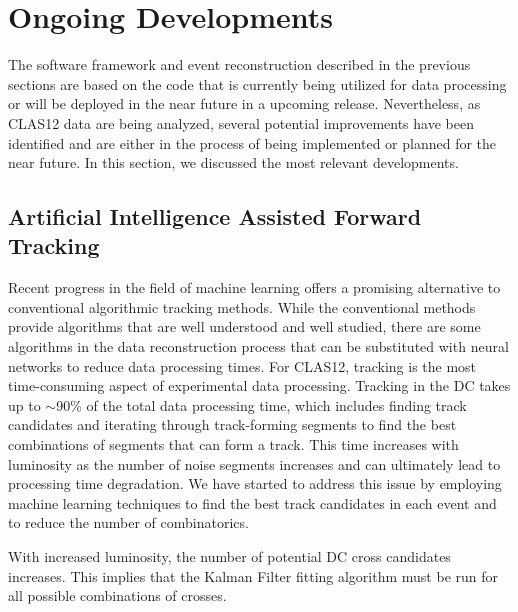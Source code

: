 \section{Ongoing Developments}

The software framework and event reconstruction described in the previous sections are based on the code that
is currently being utilized for data processing or will be deployed in the near future in a upcoming release.
Nevertheless, as CLAS12 data are being analyzed, several potential improvements have been identified and are
either in the process of being implemented or planned for the near future. In this section, we discussed the most
relevant developments.

\subsection{Artificial Intelligence Assisted Forward Tracking}

Recent progress in the field of machine learning offers a promising alternative to conventional algorithmic tracking
methods. While the conventional methods provide algorithms that are well understood and well studied, there are
some algorithms in the data reconstruction process that can be substituted with neural networks to reduce data
processing times. For CLAS12, tracking is the most time-consuming aspect of experimental data processing.
Tracking in the DC takes up to $\sim$90\% of the total data processing time, which includes finding track
candidates and iterating through track-forming segments to find the best combinations of segments that can form
a track. This time increases with luminosity as the number of noise segments increases and can ultimately lead to
processing time degradation. We have started to address this issue by employing machine learning techniques
to find the best track candidates in each event and to reduce the number of combinatorics.

With increased luminosity, the number of potential DC cross candidates increases. This implies that the Kalman
Filter fitting algorithm must be run for all possible combinations of crosses. 

